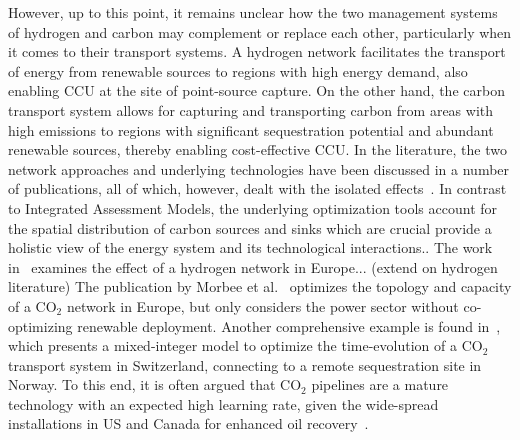 \documentclass[twocolumn]{article}
\newcommand{\carbon}{CO$_2$}
\begin{document}
However, up to this point, it remains unclear how the two management systems of hydrogen and carbon may complement or replace each other, particularly when it comes to their transport systems. A hydrogen network facilitates the transport of energy from renewable sources to regions with high energy demand, also enabling CCU at the site of point-source capture. On the other hand, the carbon transport system allows for capturing and transporting carbon from areas with high emissions to regions with significant sequestration potential and abundant renewable sources, thereby enabling cost-effective CCU.
In the literature, the two network approaches and underlying technologies have been discussed in a number of publications, all of which, however, dealt with the isolated effects~\cite{bakkenLinearModelsOptimization2008,morbeeOptimisedDeploymentEuropean2012,stewartFeasibilityEuropeanwideIntegrated2014,oeiModelingCarbonCapture2014,elahiMultiperiodLeastCost2014,burandtDecarbonizingChinaEnergy2019,middletonSimCCSOpensourceTool2020,bjerketvedtOptimalDesignCost2020,weiProposedGlobalLayout2021,damoreOptimalDesignEuropean2021,bec attiniCarbonDioxideCapture2022}. In contrast to Integrated Assessment Models, the underlying optimization tools account for the spatial distribution of carbon sources and sinks which are crucial provide a holistic view of the energy system and its technological interactions.. The work in~\cite{neumannBenefitsHydrogenNetwork2022} examines the effect of a hydrogen network in Europe... (extend on hydrogen literature)
The publication by Morbee et al.~\cite{morbeeOptimisedDeploymentEuropean2012} optimizes the topology and capacity of a \carbon{} network in Europe, but only considers the power sector without co-optimizing renewable deployment.
Another comprehensive example is found in~\cite{becattiniCarbonDioxideCapture2022}, which presents a mixed-integer model to optimize the time-evolution of a \carbon{} transport system in Switzerland, connecting to a remote sequestration site in Norway. To this end, it is often argued that \carbon{} pipelines are a mature technology with an expected high learning rate, given the wide-spread installations in US and Canada for enhanced oil recovery~\cite{righettiSitingCarbonDioxide2017,friedmannNETZEROGEOSPHERICRETURN}.
\end{document}
